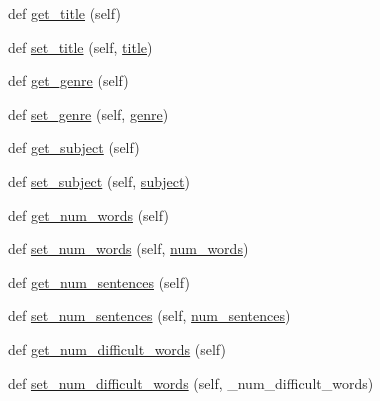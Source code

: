 \begin{DoxyCompactItemize}
\item 
def \mbox{\hyperlink{classbridges_1_1data__src__dependent_1_1gutenberg__book_1_1_gutenberg_book_a6ed03ba076cf2abd5d72cd4bd1a4053b}{get\+\_\+title}} (self)
\item 
def \mbox{\hyperlink{classbridges_1_1data__src__dependent_1_1gutenberg__book_1_1_gutenberg_book_ab4aca7f8ce3db4091c0cccb57712d0b2}{set\+\_\+title}} (self, \mbox{\hyperlink{classbridges_1_1data__src__dependent_1_1gutenberg__book_1_1_gutenberg_book_a7700d291f24896980e087c5952155df4}{title}})
\item 
def \mbox{\hyperlink{classbridges_1_1data__src__dependent_1_1gutenberg__book_1_1_gutenberg_book_a1478837589f5c52116b2f54a9fd3ba89}{get\+\_\+genre}} (self)
\item 
def \mbox{\hyperlink{classbridges_1_1data__src__dependent_1_1gutenberg__book_1_1_gutenberg_book_ab24dd32964b80e34141ee80ed05a02b3}{set\+\_\+genre}} (self, \mbox{\hyperlink{classbridges_1_1data__src__dependent_1_1gutenberg__book_1_1_gutenberg_book_a5110d617cee64356d10a273f2fb9f75f}{genre}})
\item 
def \mbox{\hyperlink{classbridges_1_1data__src__dependent_1_1gutenberg__book_1_1_gutenberg_book_a8f67c54e5969d4f2429960691e172e6e}{get\+\_\+subject}} (self)
\item 
def \mbox{\hyperlink{classbridges_1_1data__src__dependent_1_1gutenberg__book_1_1_gutenberg_book_a2ad548b10b402df031ab022b5e30babb}{set\+\_\+subject}} (self, \mbox{\hyperlink{classbridges_1_1data__src__dependent_1_1gutenberg__book_1_1_gutenberg_book_aa95fbfacfe87275307d4acd3a8e2ef76}{subject}})
\item 
def \mbox{\hyperlink{classbridges_1_1data__src__dependent_1_1gutenberg__book_1_1_gutenberg_book_a5c55b8912dbc148d6c94963e80136f2e}{get\+\_\+num\+\_\+words}} (self)
\item 
def \mbox{\hyperlink{classbridges_1_1data__src__dependent_1_1gutenberg__book_1_1_gutenberg_book_aacc82b3db83404d358edbfbb22c8953d}{set\+\_\+num\+\_\+words}} (self, \mbox{\hyperlink{classbridges_1_1data__src__dependent_1_1gutenberg__book_1_1_gutenberg_book_afdc22e6c5e61e035df55eee13f7a0fa6}{num\+\_\+words}})
\item 
def \mbox{\hyperlink{classbridges_1_1data__src__dependent_1_1gutenberg__book_1_1_gutenberg_book_a9f5caa6d24f9e87d9445bffda22f32f8}{get\+\_\+num\+\_\+sentences}} (self)
\item 
def \mbox{\hyperlink{classbridges_1_1data__src__dependent_1_1gutenberg__book_1_1_gutenberg_book_aac10ef86096250ab1a2bd8d78971959b}{set\+\_\+num\+\_\+sentences}} (self, \mbox{\hyperlink{classbridges_1_1data__src__dependent_1_1gutenberg__book_1_1_gutenberg_book_a476b189504aae2d29b7566ae0ff9993a}{num\+\_\+sentences}})
\item 
def \mbox{\hyperlink{classbridges_1_1data__src__dependent_1_1gutenberg__book_1_1_gutenberg_book_ab52d4a9842a5a4e7de2389016ac413d4}{get\+\_\+num\+\_\+difficult\+\_\+words}} (self)
\item 
def \mbox{\hyperlink{classbridges_1_1data__src__dependent_1_1gutenberg__book_1_1_gutenberg_book_a6df1b144c56c6423d13b4df29ddff844}{set\+\_\+num\+\_\+difficult\+\_\+words}} (self, \+\_\+num\+\_\+difficult\+\_\+words)
\end{DoxyCompactItemize}
